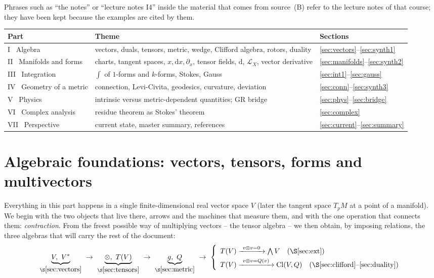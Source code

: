 \documentclass[11pt,a4paper]{article}
\numberwithin{equation}{section}
\theoremstyle{definition}
\theoremstyle{plain}
\newcommand{\dd}{\mathrm{d}}
\newcommand{\Cl}{\mathrm{Cl}}
\newcommand{\Lie}{\mathcal{L}}
\begin{document}
Phrases such as ``the notes'' or ``lecture notes I4'' inside the material that comes from source~(B) refer to the lecture notes of that course; they have been kept because the examples are cited by them.

\begin{center}
\small
\begin{tabular}{@{}p{4.3cm}p{6.6cm}p{3.2cm}@{}}
\toprule
\textbf{Part} & \textbf{Theme} & \textbf{Sections}\\
\midrule
I \ Algebra & vectors, duals, tensors, metric, wedge, Clifford algebra, rotors, duality & \ref{sec:vectors}--\ref{sec:synth1}\\
II \ Manifolds and forms & charts, tangent spaces, $x,\dd x,\partial_x$, tensor fields, $\dd$, $\Lie_X$, vector derivative & \ref{sec:manifolds}--\ref{sec:synth2}\\
III \ Integration & $\int$ of $1$-forms and $k$-forms, Stokes, Gauss & \ref{sec:int1}--\ref{sec:gauss}\\
IV \ Geometry of a metric & connection, Levi-Civita, geodesics, curvature, deviation & \ref{sec:conn}--\ref{sec:synth3}\\
V \ Physics & intrinsic versus metric-dependent quantities; GR bridge & \ref{sec:phys}--\ref{sec:bridge}\\
VI \ Complex analysis & residue theorem as Stokes' theorem & \ref{sec:complex}\\
VII \ Perspective & current state, master summary, references & \ref{sec:current}--\ref{sec:summary}\\
\bottomrule
\end{tabular}
\end{center}

\clearpage

\part{Algebraic foundations: vectors, tensors, forms and multivectors}\label{part:algebra}

Everything in this part happens in a single finite-dimensional real vector space $V$ (later the tangent space
$T_pM$ at a point of a manifold). We begin with the two objects that live there, arrows and the machines that
measure them, and with the one operation that connects them: \emph{contraction}. From the freest possible way of
multiplying vectors -- the tensor algebra -- we then obtain, by imposing relations, the three algebras that will carry the rest of the
document:
\[
\underbrace{V,\ V^*}_{\S\ref{sec:vectors}}\ \to\
\underbrace{\otimes,\ T(V)}_{\S\ref{sec:tensors}}\ \to\
\underbrace{g,\ Q}_{\S\ref{sec:metric}}\ \to\
\left\{\begin{array}{l}
 T(V)\xrightarrow{\ v\otimes v=0\ }\textstyle\bigwedge V\quad(\S\ref{sec:ext})\\[3pt]
 T(V)\xrightarrow{\ v\otimes v=Q(v)\ }\Cl(V,Q)\quad(\S\ref{sec:clifford}\text{--}\ref{sec:duality})
\end{array}\right.
\]
\end{document}

